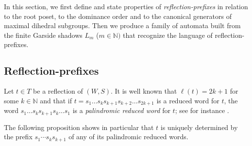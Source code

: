 \documentclass{amsart}
\theoremstyle{definition}
\begin{document}
In this section, we  first define and state properties of {\em reflection-prefixes} in relation to the root poset, to the dominance order and to the canonical generators of maximal dihedral subgroups.  Then we produce a family of automata built from the finite Garside shadows $L_m$ ($m\in\mathbb N)$  that recognize the language of reflection-prefixes. 


\subsection{Reflection-prefixes}\label{ss:reflectionprefixes}

 Let $t\in T$ be a reflection of $(W,S)$. It is well known that $\ell(t)=2k+1$ for some $k\in\mathbb N$ and that  if $t=s_1\dots s_k s_{k+1} s_{k+2} \dots s_{2k+1}$ is a reduced word for $t$, the word $s_1 \dots s_k s_{k+1} s_k\dots s_1$ is a {\em palindromic reduced word} for $t$; see for instance \cite[Proposition~2.3]{DFHM24}.  
 
 The following proposition shows in particular that $t$ is uniquely determined by the prefix $s_1\cdots s_ks_{k+1}$ of any of its palindromic reduced words. 
 
\end{document}
